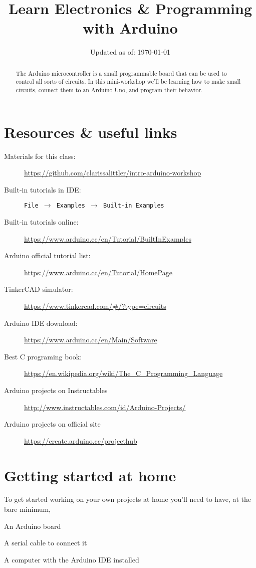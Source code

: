 \documentclass[letterpage,12pt]{article}
\title{Learn Electronics \& Programming with Arduino\vspace{-2ex}}
\date{Updated as of: \today\vspace{-2ex}}
\begin{document}
\maketitle
\begin{abstract}
  The Arduino microcontroller is a small programmable board that can be used to control all sorts of circuits. In this mini-workshop we'll be learning how to make small circuits, connect them to an Arduino Uno, and program their behavior.
\end{abstract}

\section*{Resources \& useful links}

\begin{description}
  \item[Materials for this class:] \url{https://github.com/clarissalittler/intro-arduino-workshop}
  \item[Built-in tutorials in IDE:] \texttt{File $\rightarrow$ Examples $\rightarrow$ Built-in Examples}
  \item[Built-in tutorials online:] \url{https://www.arduino.cc/en/Tutorial/BuiltInExamples}
  \item[Arduino official tutorial list:] \url{https://www.arduino.cc/en/Tutorial/HomePage}
  \item[TinkerCAD simulator:] \url{https://www.tinkercad.com/#/?type=circuits}
  \item[Arduino IDE download:] \url{https://www.arduino.cc/en/Main/Software}
  \item[Best C programing book:] \url{https://en.wikipedia.org/wiki/The_C_Programming_Language}
  \item[Arduino projects on Instructables] \url{http://www.instructables.com/id/Arduino-Projects/}
  \item[Arduino projects on official site] \url{https://create.arduino.cc/projecthub}
\end{description}
\section*{Getting started at home}
To get started working on your own projects at home you'll need to have, at the bare minimum,
\begin{enumerate*}
  \item An Arduino board
  \item A serial cable to connect it
  \item A computer with the Arduino IDE installed
\end{enumerate*}
\end{document}
